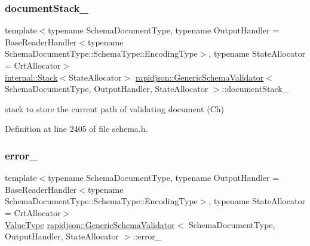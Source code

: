 \subsubsection{\texorpdfstring{documentStack\_}{documentStack\_}}
{\footnotesize\ttfamily template$<$typename Schema\+Document\+Type, typename Output\+Handler = Base\+Reader\+Handler$<$typename Schema\+Document\+Type\+::\+Schema\+Type\+::\+Encoding\+Type$>$, typename State\+Allocator = Crt\+Allocator$>$ \\
\mbox{\hyperlink{classrapidjson_1_1internal_1_1_stack}{internal\+::\+Stack}}$<$State\+Allocator$>$ \mbox{\hyperlink{classrapidjson_1_1_generic_schema_validator}{rapidjson\+::\+Generic\+Schema\+Validator}}$<$ Schema\+Document\+Type, Output\+Handler, State\+Allocator $>$\+::document\+Stack\+\_\+\hspace{0.3cm}{\ttfamily [private]}}



stack to store the current path of validating document (Ch) 



Definition at line 2405 of file schema.\+h.

\mbox{\label{classrapidjson_1_1_generic_schema_validator_a7c3b67480cc73d789ba9d3b66bd7706f}} 
\subsubsection{\texorpdfstring{error\_}{error\_}}
{\footnotesize\ttfamily template$<$typename Schema\+Document\+Type, typename Output\+Handler = Base\+Reader\+Handler$<$typename Schema\+Document\+Type\+::\+Schema\+Type\+::\+Encoding\+Type$>$, typename State\+Allocator = Crt\+Allocator$>$ \\
\mbox{\hyperlink{classrapidjson_1_1_generic_schema_validator_a14216aea798d69f102987c1aae36e897}{Value\+Type}} \mbox{\hyperlink{classrapidjson_1_1_generic_schema_validator}{rapidjson\+::\+Generic\+Schema\+Validator}}$<$ Schema\+Document\+Type, Output\+Handler, State\+Allocator $>$\+::error\+\_\+\hspace{0.3cm}{\ttfamily [private]}}



